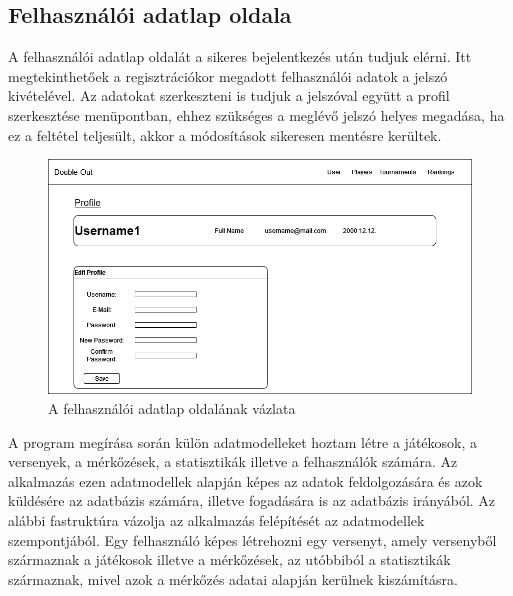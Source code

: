 \subsection{Felhasználói adatlap oldala}
A felhasználói adatlap oldalát a sikeres bejelentkezés után tudjuk elérni. Itt megtekinthetőek a regisztrációkor megadott felhasználói adatok a jelszó kivételével. Az adatokat szerkeszteni is tudjuk a jelszóval együtt a profil szerkesztése menüpontban, ehhez szükséges a meglévő jelszó helyes megadása, ha ez a feltétel teljesült, akkor a módosítások sikeresen mentésre kerültek.

\begin{figure}[h]
\centering
\includegraphics[scale=0.3]{images/ProfilePage.drawio.png}
\caption{A felhasználói adatlap oldalának vázlata}
\label{fig:cimer}
\end{figure}

A program megírása során külön adatmodelleket hoztam létre a játékosok, a versenyek, a mérkőzések, a statisztikák illetve a felhasználók számára. Az alkalmazás ezen adatmodellek alapján képes az adatok feldolgozására és azok küldésére az adatbázis számára, illetve fogadására is az adatbázis irányából. Az alábbi fastruktúra vázolja az alkalmazás felépítését az adatmodellek szempontjából. Egy felhasználó képes létrehozni egy versenyt, amely versenyből származnak a játékosok illetve a mérkőzések, az utóbbiból a statisztikák származnak, mivel azok a mérkőzés adatai alapján kerülnek kiszámításra.

